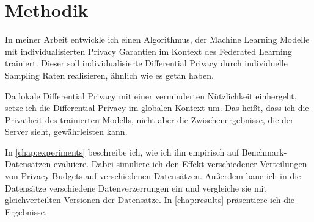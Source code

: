 \chapter{Methodik}\label{chap:methods}

	

In meiner Arbeit entwickle ich einen Algorithmus, der Machine Learning Modelle mit individualisierten Privacy Garantien im Kontext des Federated Learning trainiert. Dieser soll individualisierte Differential Privacy durch individuelle Sampling Raten realisieren, ähnlich wie es \textcite{jorgensen:2015, boenisch:2023} getan haben.

Da lokale Differential Privacy mit einer verminderten Nützlichkeit einhergeht, setze ich die Differential Privacy im globalen Kontext um. Das heißt, dass ich die Privatheit des trainierten Modells, nicht aber die Zwischenergebnisse, die der Server sieht, gewährleisten kann.

In \autoref{chap:experiments} beschreibe ich, wie ich ihn empirisch auf Benchmark-Datensätzen evaluiere. Dabei simuliere ich den Effekt verschiedener Verteilungen von Privacy-Budgets auf verschiedenen Datensätzen. Außerdem baue ich in die Datensätze verschiedene Datenverzerrungen ein und vergleiche sie mit gleichverteilten Versionen der Datensätze. In \autoref{chap:results} präsentiere ich die Ergebnisse.

